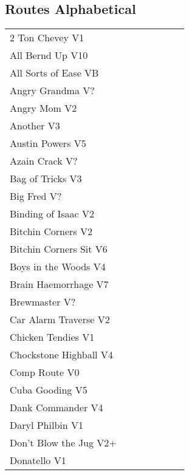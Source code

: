 \begin{multicols*}{2}
\section{Routes Alphabetical}
\begin{center}
\begin{supertabular}{p{0.65\linewidth}r}
2 Ton Chevey V1 & \pageref{rt:2 Ton Chevey} \\
All Bernd Up V10 & \pageref{rt:All Bernd Up} \\
All Sorts of Ease VB & \pageref{rt:All Sorts of Ease} \\
Angry Grandma V? & \pageref{rt:Angry Grandma} \\
Angry Mom V2 & \pageref{rt:Angry Mom} \\
Another V3 & \pageref{rt:Another} \\
Austin Powers V5 & \pageref{rt:Austin Powers} \\
Azain Crack V? & \pageref{rt:Azain Crack} \\
Bag of Tricks V3 & \pageref{vr:Bag of Tricks} \\
Big Fred V? & \pageref{rt:Big Fred} \\
Binding of Isaac V2 & \pageref{rt:Binding of Isaac} \\
Bitchin Corners V2 & \pageref{rt:Bitchin Corners} \\
Bitchin Corners Sit V6 & \pageref{vr:Bitchin Corners Sit} \\
Boys in the Woods V4 & \pageref{rt:Boys in the Woods} \\
Brain Haemorrhage V7 & \pageref{vr:Brain Haemorrhage} \\
Brewmaster V? & \pageref{rt:Brewmaster} \\
Car Alarm Traverse V2 & \pageref{rt:Car Alarm Traverse} \\
Chicken Tendies V1 & \pageref{rt:Chicken Tendies} \\
Chockstone Highball V4 & \pageref{rt:Chockstone Highball} \\
Comp Route V0 & \pageref{rt:Comp Route} \\
Cuba Gooding V5 & \pageref{rt:Cuba Gooding} \\
Dank Commander V4 & \pageref{rt:Dank Commander} \\
Daryl Philbin V1 & \pageref{rt:Daryl Philbin} \\
Don't Blow the Jug V2+ & \pageref{rt:Don't Blow the Jug} \\
Donatello V1 & \pageref{rt:Donatello} \\

\end{supertabular}
\end{center}
\end{multicols*}
